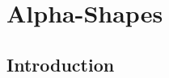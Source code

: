 %
%
%
%
%
%
%
%
%
%



\chapter{Alpha-Shapes} \label{I1_ChapterAlphashapes}

\ccChapterSubTitle{\alphashapeRevision, \alphashapeDate}

\section{Introduction}

